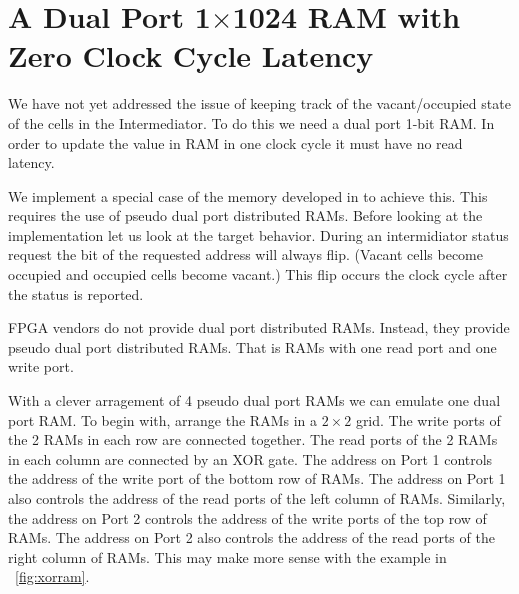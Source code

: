 \section{A Dual Port 1$\times$1024 RAM with Zero Clock Cycle Latency}
\label{sec:dualmemory}
We have not yet addressed the issue of keeping track of the vacant/occupied state of the cells in the Intermediator. To do this we need a dual port 1-bit RAM. In order to update the value in RAM in one clock cycle it must have no read latency. \par
We implement a special case of the memory developed in \cite{prelim:laforest2} to achieve this. This requires the use of pseudo dual port distributed RAMs. Before looking at the implementation let us look at the target behavior. During an intermidiator status request the bit of  the requested address will always flip. (Vacant cells become occupied and occupied cells become vacant.) This flip occurs the clock cycle after the status is reported.\par
FPGA vendors do not provide dual port distributed RAMs. Instead, they provide pseudo dual port distributed RAMs. That is RAMs with one read port and one write port. \par
With a clever arragement of 4 pseudo dual port RAMs we can emulate one dual port RAM. To begin with, arrange the RAMs in a $2\times 2$ grid. The write ports of the 2 RAMs in each row are connected together. The read ports of the 2 RAMs in each column are connected by an XOR gate. The address on Port 1 controls the address of the write port of the bottom row of RAMs. The address on Port 1 also controls the address of the read ports of the left column of RAMs. Similarly, the address on Port 2 controls the address of the write ports of the top row of RAMs. The address on Port 2 also controls the address of the read ports of the right column of RAMs. This may make more sense with the example in \figurename~\ref{fig:xorram}. \par
